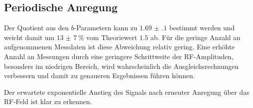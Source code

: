 \subsection{Periodische Anregung}

Der Quotient aus den $b$-Parametern kann zu $\num{1.69(10)}$ bestimmt werden und weicht damit um $\SI{13(7)}{\percent}$ vom Theoriewert $1.5$ ab.
Für die geringe Anzahl an aufgenommenen Messdaten ist diese Abweichung relativ gering. 
Eine erhöhte Anzahl an Messungen durch eine geringere Schrittweite der RF-Amplituden, besonders im niedrigen Bereich, wird wahrscheinlich die Ausgleichsrechnungen verbessern und damit zu genaueren Ergebnissen führen können.



Der erwartete exponentielle Anstieg des Signals nach erneuter Anregung über das RF-Feld ist klar zu erkennen.

